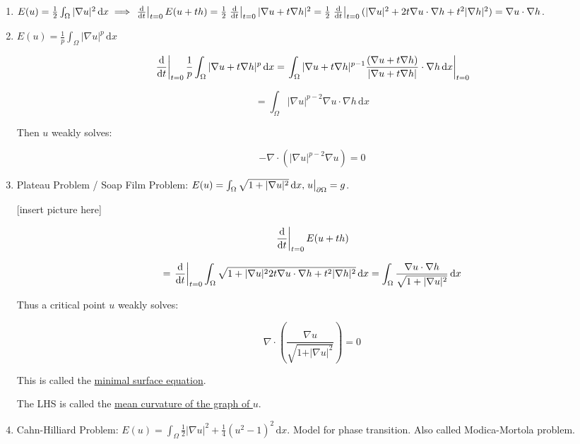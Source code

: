 \documentclass{article}
\theoremstyle{definition}
\begin{document}
\begin{enumerate}[label=\roman*)]
    \item \(E(u) = \frac{1}{2}\int_{\Omega} \vert \nabla u \vert ^2 \,\mathrm{d}x \implies \eval{\frac{\mathrm{d}}{\mathrm{d}t}}_{t=0} E(u+th) = \frac{1}{2}\eval{\frac{\mathrm{d}}{\mathrm{d}t}}_{t=0} \vert\nabla u + t \nabla h\vert^2 = \frac{1}{2}\eval{\frac{\mathrm{d}}{\mathrm{d}t}}_{t=0} (\vert \nabla u \vert^2 + 2 t \nabla u \cdot \nabla h + t^2 \vert \nabla h \vert^2) = \nabla u \cdot \nabla h\).
    \item \(E(u) = \frac{1}{p} \int_{\Omega} \vert \nabla u \vert^p \,\mathrm{d}x\)
    
    \[
        \eval{\frac{\mathrm{d}}{\mathrm{d}t}}_{t=0} \frac{1}{p} \int_{\Omega} \vert \nabla u + t \nabla h \vert ^p \,\mathrm{d}x = \eval{\int_{\Omega} \vert \nabla u + t\nabla h \vert ^{p-1} \frac{(\nabla u + t\nabla h)}{\vert \nabla u + t\nabla h \vert} \cdot\nabla h \,\mathrm{d}x }_{t=0}
    \]

    \[
        = \int_{\Omega} \vert \nabla u \vert ^{p-2} \nabla u \cdot \nabla h \,\mathrm{d}x 
    \]

    Then \(u\) weakly solves:

    \[
        - \nabla \cdot \left( \vert \nabla u \vert ^{p-2} \nabla u \right) = 0
    \]

    \item Plateau Problem / Soap Film Problem: \(E(u) = \int_{\Omega} \sqrt{1 + \vert \nabla u \vert ^2} \,\mathrm{d}x, \eval{u}_{\partial \Omega} = g\).
    
    [insert picture here]

    \[
        \eval{\frac{\mathrm{d}}{\mathrm{d}t}}_{t=0} E(u+th)
    \]

    \[
        = \eval{\frac{\mathrm{d}}{\mathrm{d}t}}_{t=0} \int_{\Omega} \sqrt{1 + \vert \nabla u \vert^2  2 t \nabla u \cdot \nabla h + t^2 \vert \nabla h \vert^2} \,\mathrm{d}x = \int_{\Omega} \frac{\nabla u \cdot \nabla h}{\sqrt{1+\vert \nabla u \vert^2}} \,\mathrm{d}x 
    \]

    Thus a critical point \(u\) weakly solves:

    \[
        \nabla \cdot \left( \frac{\nabla u}{\sqrt{1 + \vert \nabla u \vert^2} } \right) = 0
    \]

    This is called the \underline{minimal surface equation}.
    
    The LHS is called the \underline{mean curvature of the graph of \(u\)}.

    \item Cahn-Hilliard Problem: \(E(u) = \int_{\Omega} \frac{1}{2} \vert \nabla u \vert ^ 2 + \frac{1}{4} (u^2 - 1)^2 \,\mathrm{d}x \). Model for phase transition. Also called Modica-Mortola problem.
    

\end{enumerate}
\end{document}
